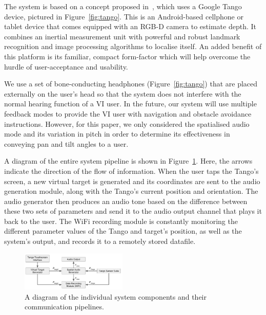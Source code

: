\documentclass[format=sigconf, review=true, screen=true, anonymous=true]{acmart}
\begin{document}
The system is based on a concept proposed in~\cite{bellotto2013, lock2017portable}, which uses a Google Tango device, pictured in Figure~\ref{fig:tango}. This is an Android-based cellphone or tablet device that comes equipped with an RGB-D camera to estimate depth. It combines an inertial measurement unit with powerful and robust landmark recognition and image processing algorithms to localise itself. An added benefit of this platform is its familiar, compact form-factor which will help overcome the hurdle of user-acceptance and usability. %

We use a set of bone-conducting headphones (Figure~\ref{fig:tango}) that are placed externally on the user's head so that the system does not interfere with the normal hearing function of a VI user. In the future, our system will use multiple feedback modes to provide the VI user with navigation and obstacle avoidance instructions. However, for this paper, we only considered the spatialised audio mode and its variation in pitch in order to determine its effectiveness in conveying pan and tilt angles to a user.

A diagram of the entire system pipeline is shown in Figure~\ref{fig:pipeline}. Here, the arrows indicate the direction of the flow of information. When the user taps the Tango's screen, a new virtual target is generated and its coordinates are sent to the audio generation module, along with the Tango's current position and orientation. The audio generator then produces an audio tone based on the difference between these two sets of parameters and send it to the audio output channel that plays it back to the user. The WiFi recording module is constantly monitoring the different parameter values of the Tango and target's position, as well as the system's output, and records it to a remotely stored datafile. 

\begin{figure}
  \centering
  \includegraphics[width=0.45\textwidth]{figures/pipeline.pdf}
  \caption{A diagram of the individual system components and their communication pipelines. }
  \label{fig:pipeline}
\end{figure}
\end{document}
